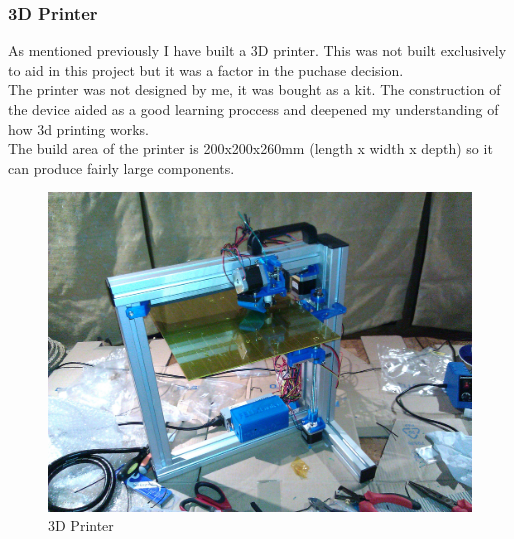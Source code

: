 \documentclass[11pt,fleqn,twoside]{article}
\begin{document}
\subsubsection{3D Printer}
As mentioned previously I have built a 3D printer.  This was not built exclusively to aid in this project but it was a factor in the puchase decision.
\\The printer was not designed by me, it was bought as a kit.  The construction of the device aided as a good learning proccess and deepened my understanding of how 3d printing works.
\\The build area of the printer is 200x200x260mm (length x width x depth) so it can produce fairly large components.
\begin{figure}[h]
\centering
        \includegraphics[width=5.0in] {figures/printer.jpg}
        \caption{3D Printer}
        \label{3D Printer}
\end{figure}
\end{document}
